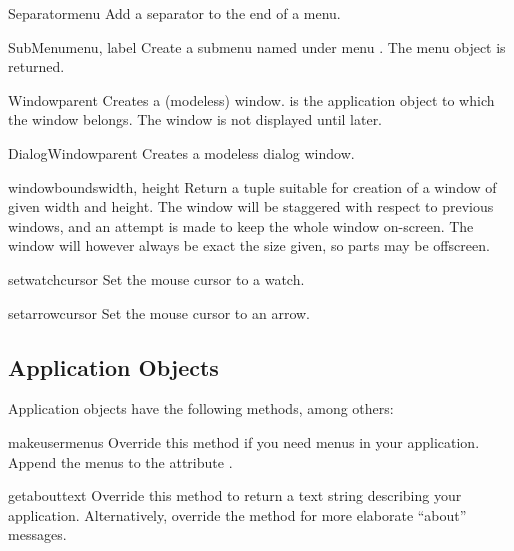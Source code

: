 \begin{funcdesc}{Separator}{menu}
Add a separator to the end of a menu.
\end{funcdesc}

\begin{funcdesc}{SubMenu}{menu, label}
Create a submenu named  under menu . The menu
object is returned.
\end{funcdesc}

\begin{funcdesc}{Window}{parent}
Creates a (modeless) window.  is the application object to
which the window belongs. The window is not displayed until later.
\end{funcdesc}

\begin{funcdesc}{DialogWindow}{parent}
Creates a modeless dialog window.
\end{funcdesc}

\begin{funcdesc}{windowbounds}{width, height}
Return a 
tuple suitable for creation of a window of given width and height. The
window will be staggered with respect to previous windows, and an
attempt is made to keep the whole window on-screen. The window will
however always be exact the size given, so parts may be offscreen.
\end{funcdesc}

\begin{funcdesc}{setwatchcursor}{}
Set the mouse cursor to a watch.
\end{funcdesc}

\begin{funcdesc}{setarrowcursor}{}
Set the mouse cursor to an arrow.
\end{funcdesc}


\subsection{Application Objects \label{application-objects}}

Application objects have the following methods, among others:


\begin{methoddesc}[Application]{makeusermenus}{}
Override this method if you need menus in your application. Append the
menus to the attribute .
\end{methoddesc}

\begin{methoddesc}[Application]{getabouttext}{}
Override this method to return a text string describing your
application.  Alternatively, override the  method
for more elaborate ``about'' messages.
\end{methoddesc}

